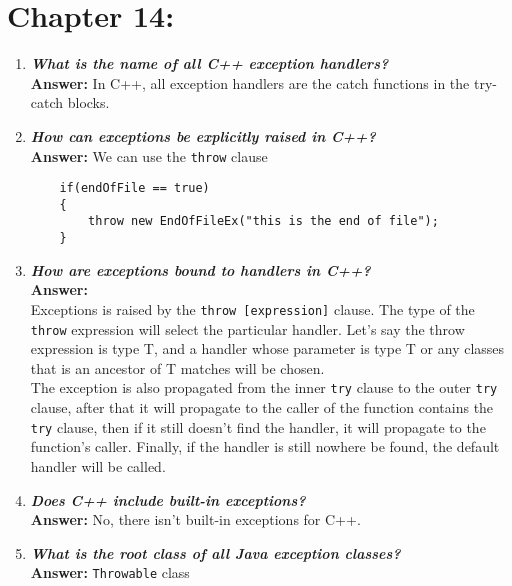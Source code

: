 \documentclass{article}
\begin{document}
\section{Chapter 14:}
\begin{enumerate}

\item 
\textbf{\textit{What is the name of all C++ exception handlers?}}\\
\textbf{Answer: } In C++, all exception handlers are the catch functions in the try-catch blocks.

\item 
\textbf{\textit{How can exceptions be explicitly raised in C++?}}\\
\textbf{Answer: } We can use the \lstinline{throw} clause\\
\begin{lstlisting}
	if(endOfFile == true)
	{
		throw new EndOfFileEx("this is the end of file");
	}
\end{lstlisting}


\item 
\textbf{\textit{How are exceptions bound to handlers in C++?}}\\
\textbf{Answer: }\\ 
Exceptions is raised by the \lstinline{throw [expression]} clause. The type of the \lstinline{throw} expression will select the particular handler. Let's say the throw expression is type T, and a handler whose parameter is type T or any classes that is an ancestor of T matches will be chosen.\\
The exception is also propagated from the inner \lstinline{try} clause to the outer \lstinline{try} clause, after that it will propagate to the caller of the function contains the \lstinline{try} clause, then if it still doesn't find the handler, it will propagate to the function's caller. Finally, if the handler is still nowhere be found, the default handler will be called.\\

\item 
\textbf{\textit{Does C++ include built-in exceptions?}}\\
\textbf{Answer: } No, there isn't built-in exceptions for C++.

\item 
\textbf{\textit{What is the root  class of all Java exception classes?}}\\
\textbf{Answer: } \lstinline{Throwable} class


\end{enumerate}
\end{document}
